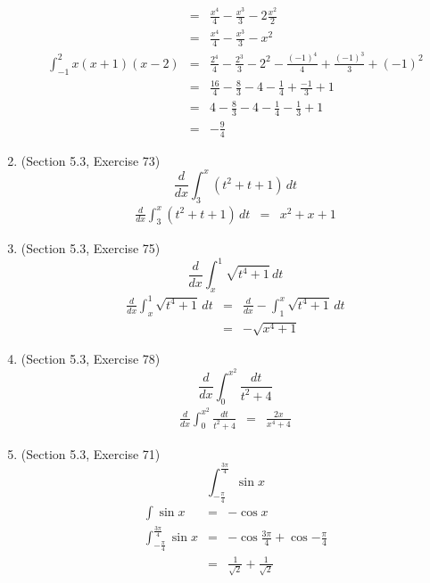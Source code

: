 \documentclass{article}
\begin{document}
\begin{enumerate}
\begin{eqnarray}
                                                        &=& \frac{x^4}{4} - \frac{x^3}{3} - 2\frac{x^2}{2} \\
                                                        &=& \frac{x^4}{4} - \frac{x^3}{3} - x^2 \\
            \int_{-1}^2{x\left(x + 1\right)\left(x - 2\right)} &=& \frac{2^4}{4} - \frac{2^3}{3} - 2^2 - \frac{(-1)^4}{4} + \frac{(-1)^3}{3} + (-1)^2 \\
                                                               &=& \frac{16}{4} - \frac{8}{3} - 4 - \frac{1}{4} + \frac{-1}{3} + 1 \\
                                                               &=& 4 - \frac{8}{3} - 4 - \frac{1}{4} - \frac{1}{3} + 1 \\
                                                               &=& -\frac{9}{4}
        \end{eqnarray}
    \item (Section 5.3, Exercise 73)
        $$\frac{d}{dx}\int_3^x{\left(t^2 + t + 1\right)\,dt}$$
        \begin{eqnarray}
            \frac{d}{dx}\int_3^x{\left(t^2 + t + 1\right)\,dt} &=& x^2 + x + 1
        \end{eqnarray}
    \item (Section 5.3, Exercise 75)
        $$\frac{d}{dx}\int_x^1{\sqrt{t^4 + 1}\,dt}$$
        \begin{eqnarray}
            \frac{d}{dx}\int_x^1{\sqrt{t^4 + 1}\,dt} &=& \frac{d}{dx}-\int_1^x{\sqrt{t^4 + 1}\,dt} \\
                                                     &=& -\sqrt{x^4 + 1}
        \end{eqnarray}
    \item (Section 5.3, Exercise 78)
        $$\frac{d}{dx}\int_0^{x^2}{\frac{dt}{t^2 + 4}}$$
        \begin{eqnarray}
            \frac{d}{dx}\int_0^{x^2}{\frac{dt}{t^2 + 4}} &=& \frac{2x}{x^4 + 4}
        \end{eqnarray}
    \item (Section 5.3, Exercise 71)
        $$\int_{-\frac{\pi}{4}}^{\frac{3\pi}{4}}{\sin{x}}$$
        \begin{eqnarray}
            \int{\sin{x}} &=& -\cos{x} \\
            \int_{-\frac{\pi}{4}}^{\frac{3\pi}{4}}{\sin{x}} &=& -\cos{\frac{3\pi}{4}} + \cos{-\frac{\pi}{4}} \\
                                                            &=& \frac{1}{\sqrt{2}} + \frac{1}{\sqrt{2}} \\

\end{eqnarray}
\end{enumerate}
\end{document}

